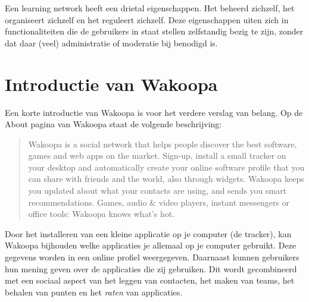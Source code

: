 \documentclass[a4paper, 10pt, pdftex]{report}
\begin{document}
            Een learning network heeft een drietal eigenschappen. Het beheerd zichzelf, het organiseert zichzelf en het reguleert zichzelf. Deze eigenschappen uiten zich in functionaliteiten die de gebruikers in staat stellen zelfstandig bezig te zijn, zonder dat daar (veel) administratie of moderatie bij benodigd is.

    \section{Introductie van Wakoopa}
      Een korte introductie van Wakoopa is voor het verdere verslag van belang. Op de About pagina van Wakoopa \citep{Gaal2007} staat de volgende beschrijving:
        \begin{quote} Wakoopa is a social network that helps people discover the best software, games and web apps on the market. Sign-up, install a small tracker on your desktop and automatically create your online software profile that you can share with friends and the world, also through widgets. Wakoopa keeps you updated about what your contacts are using, and sends you smart recommendations. Games, audio \& video players, instant messengers or office tools: Wakoopa knows what's hot.
        \end{quote}
      Door het installeren van een kleine applicatie op je computer (de tracker), kan Wakoopa bijhouden welke applicaties je allemaal op je computer gebruikt. Deze gegevens worden in een online profiel weergegeven. Daarnaast kunnen gebruikers hun mening geven over de applicaties die zij gebruiken. Dit wordt gecombineerd met een sociaal aspect van het leggen van contacten, het maken van teams, het behalen van punten en het \emph{raten} van applicaties.
\end{document}
